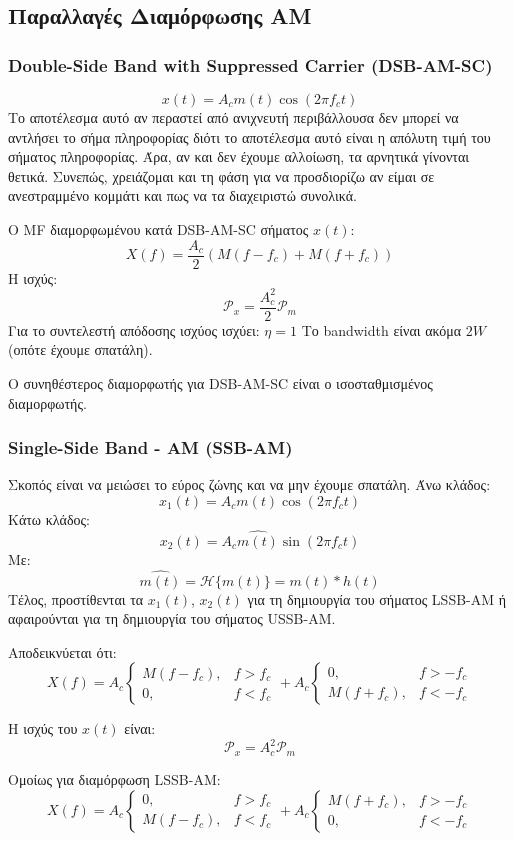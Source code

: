 \documentclass[a4paper,12pt]{article}
\begin{document}
\subsection*{Παραλλαγές Διαμόρφωσης AM}
\subsubsection*{Double-Side Band with Suppressed Carrier (DSB-AM-SC)}
\[
x(t)=A_cm(t) \cos(2\pi f_c t)
\]
Το αποτέλεσμα αυτό αν περαστεί από ανιχνευτή περιβάλλουσα δεν μπορεί να αντλήσει το σήμα πληροφορίας διότι το αποτέλεσμα αυτό είναι η απόλυτη τιμή του σήματος πληροφορίας. Άρα, αν και δεν έχουμε αλλοίωση, τα αρνητικά γίνονται θετικά. Συνεπώς, χρειάζομαι και τη φάση για να προσδιορίζω αν είμαι σε ανεστραμμένο κομμάτι και πως να τα διαχειριστώ συνολικά.

Ο MF διαμορφωμένου κατά DSB-AM-SC σήματος \(x(t)\):
\[
X(f)=\frac{A_c}{2}(M(f-f_c)+M(f+f_c))
\]
Η ισχύς:
\[
\mathcal{P}_x=\frac{A_c^2}{2}\mathcal{P}_m
\]
Για το συντελεστή απόδοσης ισχύος ισχύει: \(\eta = 1\)
Το bandwidth είναι ακόμα \(2W\) (οπότε έχουμε σπατάλη).

Ο συνηθέστερος διαμορφωτής για DSB-AM-SC είναι ο ισοσταθμισμένος διαμορφωτής.

\subsubsection*{Single-Side Band - AM (SSB-AM)}
Σκοπός είναι να μειώσει το εύρος ζώνης και να μην έχουμε σπατάλη.
Άνω κλάδος:
\[
x_1(t)=A_c m(t) \cos(2 \pi f_c t)
\]
Κάτω κλάδος:
\[
x_2(t)=A_c \widehat{m(t)} \sin(2 \pi f_c t)
\]
Με:
\[
\widehat{m(t)}=\mathcal{H}\{m(t)\}=m(t) \ast h(t)
\]
Τέλος, προστίθενται τα \(x_1(t)\), \(x_2(t)\) για τη δημιουργία του σήματος LSSB-AM ή αφαιρούνται για τη δημιουργία του σήματος USSB-AM.

Αποδεικνύεται ότι:
\[
X(f)=A_c\left\{\begin{array}{ll}
M\left(f-f_c\right), & f>f_c \\
0, & f<f_c
\end{array}+A_c \begin{cases}0, & f>-f_c \\
M\left(f+f_c\right), & f<-f_c\end{cases}\right.
\]

Η ισχύς του \(x(t)\) είναι:
\[
\mathcal{P}_x=A_c^2 \mathcal{P}_m
\]

Ομοίως για διαμόρφωση LSSB-AM:
\[
X(f)=A_c\left\{\begin{array}{ll}
0, & f>f_c \\
M\left(f-f_c\right), & f<f_c
\end{array}+A_c \begin{cases}M\left(f+f_c\right), & f>-f_c \\
0, & f<-f_c\end{cases}\right.
\]
\end{document}
